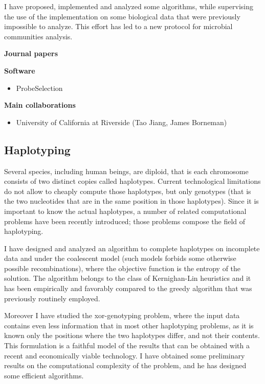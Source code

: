 \documentclass[11pt,a4paper,roman]{moderncv}
\begin{document}
I have proposed, implemented and analyzed some algorithms, while
supervising the use of the implementation on some biological data that
were previously impossible to analyze. This effort has led to a new
protocol for microbial communities analysis.

\textbf{Journal  papers}

\cite{DBLP:journals/bmcbi/RueggerVJB11}
\cite{valinskyAnalysisBacterialCommunity2002}
\cite{valinskyOligonucleotideFingerprintingRRNA2002}
\cite{bornemanProbeSelectionAlgorithms2001}

\textbf{Software}

\begin{itemize}
\item
      ProbeSelection
\end{itemize}


\textbf{Main collaborations}

\begin{itemize}
\item
      University of California at Riverside (Tao Jiang, James Borneman)
\end{itemize}

\subsection{Haplotyping}\label{haplotyping}

Several species, including human beings, are diploid, that is each
chromosome consists of two distinct copies called haplotypes. Current
technological limitations do not allow to cheaply compute those
haplotypes, but only genotypes (that is the two nucleotides that are in
the same position in those haplotypes). Since it is important to know
the actual haplotypes, a number of related computational problems have
been recently introduced; those problems compose the field of
haplotyping.

I have designed and analyzed an algorithm to complete haplotypes on
incomplete data and under the coalescent model (such models forbids some
otherwise possible recombinations), where the objective function is the
entropy of the solution. The algorithm belongs to the class of
Kernighan-Lin heuristics and it has been empirically and favorably
compared to the greedy algorithm that was previously routinely employed.

Moreover I have studied the xor-genotyping problem, where the input data
contains even less information that in most other haplotyping problems,
as it is known only the positions where the two haplotypes differ, and
not their contents. This formulation is a faithful model of the results
that can be obtained with a recent and economically viable technology.
I have obtained some preliminary results on the computational complexity
of the problem, and he has designed some efficient algorithms.
\end{document}
